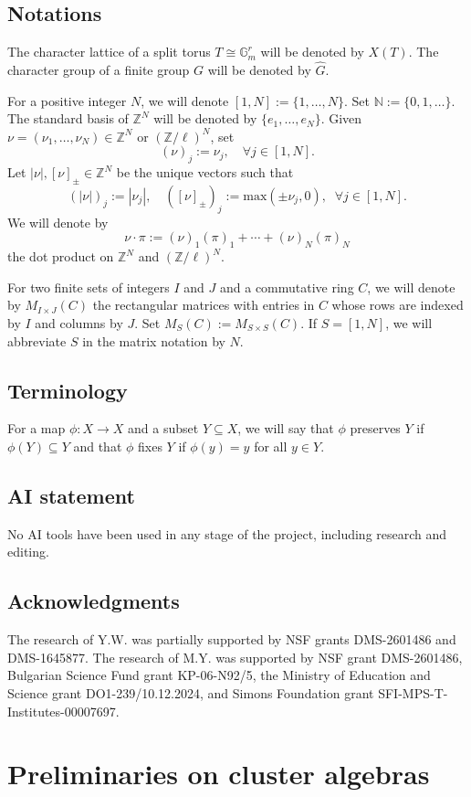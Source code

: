 \documentclass[11pt]{amsart}
\theoremstyle{plain}
\newcommand{\cleqn}{\setcounter{equation}{0}}
\newcommand{\clth}{\setcounter{theorem}{0}}
\newcommand {\sectionnew}[1]{\section{#1}\cleqn\clth}
\newcommand \lb[1]{\label{#1}}
\def \Gset {{\mathbb G}}
\def \Zset {{\mathbb Z}}
\def \Nset {{\mathbb N}}
\def \wh {\widehat}
\renewcommand \max { {\mathrm{max}} }
\begin{document}
\subsection{Notations}
The character lattice of a split torus $T \cong \Gset_m^r$ will be denoted by $X(T)$. The character group of a 
finite group $G$ will be denoted by $\wh{G}$. 

For a positive integer $N$, we will denote $[1,N]:= \{1, \ldots, N \}$. Set $\Nset := \{0, 1, \ldots\}$.
The standard basis of $\Zset^N$ will be denoted by $\{e_1, \ldots, e_N\}$. Given $\nu = (\nu_1, \ldots, \nu_N) \in \Zset^N$ or $(\Zset/\ell)^N$, set
\begin{equation}
\label{j-coord}
(\nu)_j:= \nu_j, \quad \forall j \in [1,N].
\end{equation}
Let $ |\nu|, [\nu]_\pm \in \Zset^N$ be the unique vectors such that 
\[
(|\nu|)_j := |\nu_j|, 
\quad 
([\nu]_\pm)_j := \max (\pm \nu_j, 0), \; \; \forall j \in [1,N].
\]
We will denote by 
\begin{equation}
\label{dot-prod}
\nu \cdot \pi := (\nu)_1 (\pi)_1 + \cdots + (\nu)_N (\pi)_N
\end{equation}
the dot product on $\Zset^N$ and $(\Zset/\ell)^N$. 

For two finite sets of integers $I$ and $J$ and a commutative ring $C$, we will denote by $M_{I \times J}(C)$ the rectangular matrices with entries in $C$ whose rows are indexed by $I$ and columns by $J$. Set $M_S(C):= M_{S \times S}(C)$. If $S =[1,N]$, we will abbreviate $S$ in the matrix notation by $N$.

\subsection*{Terminology} For a map $\phi : X \to X$ and a subset $Y \subseteq X$, we will say that $\phi$ preserves $Y$ if $\phi(Y) \subseteq Y$ and that $\phi$ fixes $Y$ if $\phi(y) =y$ for all $y \in Y$. 

\subsection*{AI statement} No AI tools have been used in any stage of the project, including research and editing.  

\subsection*{Acknowledgments} 
The research of Y.W. was partially supported by NSF grants DMS-2601486
and DMS-1645877. The research of M.Y. was supported by NSF grant DMS-2601486, Bulgarian Science Fund grant KP-06-N92/5, the Ministry of Education and Science grant DO1-239/10.12.2024, and Simons Foundation grant SFI-MPS-T-Institutes-00007697.
\sectionnew{Preliminaries on cluster algebras}
\lb{prelim}
\end{document}
